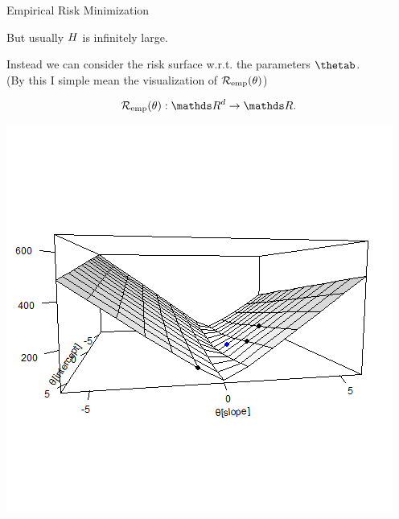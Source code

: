 \documentclass[11pt,compress,t,notes=noshow, xcolor=table]{beamer}
\begin{document}
\begin{vbframe}{Empirical Risk Minimization}

But usually $H$ is infinitely large. 

\lz

Instead we can consider the risk surface w.r.t. the parameters $\thetab$.\\
(By this I simple mean the visualization of $\mathcal{R}_{\text{emp}}(\theta)$)

\begin{table}
\begin{minipage}{0.4\linewidth}
$$\risket : \R^d \to \R.$$
\end{minipage}\hfill
	\begin{minipage}{0.55\linewidth}
\includegraphics[width=\textwidth]{figure/ml-basic-riskmin-error-surface.png}
\end{minipage}
\end{table}



\end{vbframe}
\end{document}
